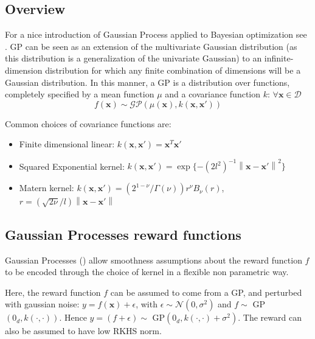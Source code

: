 \documentclass{article} %
\begin{document}
\subsection{Overview}
For a nice introduction of Gaussian Process applied to Bayesian optimization see \citet{Brochu:2009}. GP can be seen as an extension of the multivariate Gaussian distribution (as this distribution is a generalization of the univariate Gaussian) to an infinite-dimension distribution for which any finite combination of dimensions will be a Gaussian distribution. In this manner, a GP is a distribution over functions, completely specified by a mean function $\mu$ and a covariance function $k$: $\forall \mathbf{x} \in \mathcal{D}$
$$ f(\mathbf{x}) \sim \mathcal{GP} \left(\mu(\mathbf{x}), k(\mathbf{x},\mathbf{x}') \right) $$


Common choices of covariance functions are:
\begin{itemize}
\item Finite dimensional linear: $k(\mathbf{x}, \mathbf{x'}) = \mathbf{x}^T \mathbf{x'}$

\item Squared Exponential kernel: $k(\mathbf{x}, \mathbf{x'}) =  \exp \{ -(2l^2)^{-1} {\left\| \mathbf{x} - \mathbf{x'} \right\|}^2 \}$

\item Matern kernel: $k(\mathbf{x}, \mathbf{x'}) = (2^{1- \nu} / \Gamma(\nu)) r^\nu B_\nu(r)$, $r= (\sqrt{2 \nu} / l) \left\| \mathbf{x} - \mathbf{x'}\right\|$

\end{itemize}

\subsection{Gaussian Processes reward functions}
Gaussian Processes (\citet{Rasmussen:2005:GPM:1162254}) allow smoothness assumptions about the reward function $f$ to be encoded through the choice of kernel in a flexible non parametric way.

Here, the reward function $f$ can be assumed to come from a GP, and perturbed with gaussian noise:  $y=f(\mathbf{x}) + \epsilon$, with $\epsilon \sim \mathcal{N}(0, \sigma^2)$ and $ f \sim$ GP$(0_d, k(\cdot,\cdot))$. Hence $y = (f+\epsilon) \sim$ GP$(0_d, k(\cdot,\cdot) + \sigma^2)$.
The reward can also be assumed to have low RKHS norm.
\end{document}
